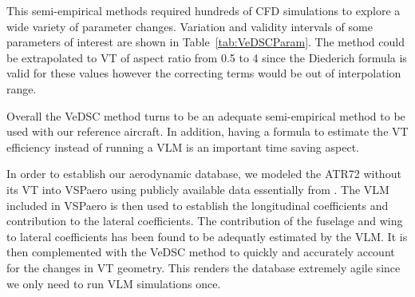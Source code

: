 This semi-empirical methods required hundreds of CFD simulations to explore a wide variety of parameter changes. Variation and validity intervals of some parameters of interest are shown in Table~\ref{tab:VeDSCParam}. The method could be extrapolated to VT of aspect ratio from 0.5 to 4 since the Diederich formula is valid for these values however the correcting terms would be out of interpolation range.



Overall the VeDSC method turns to be an adequate semi-empirical method to be used with our reference aircraft. In addition, having a formula to estimate the VT efficiency instead of running a VLM is an important time saving aspect.

In order to establish our aerodynamic database, we modeled the ATR72 without its VT into VSPaero using publicly available data essentially from \cite{JanesAircraft}. The VLM included in VSPaero is then used to establish the longitudinal coefficients and contribution to the lateral coefficients. The contribution of the fuselage and wing to lateral coefficients has been found to be adequatly estimated by the VLM. It is then complemented with the VeDSC method to quickly and accurately account for the changes in VT geometry. This renders the database extremely agile since we only need to run VLM simulations once.


